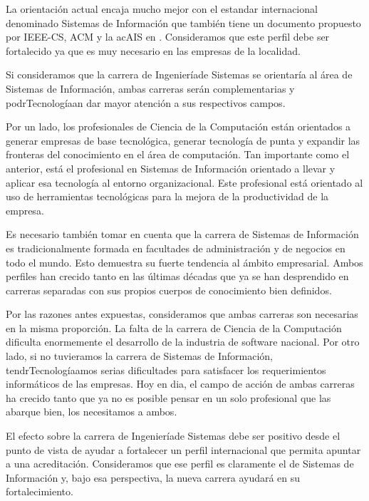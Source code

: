 La orientación actual encaja mucho mejor con el estandar
internacional denominado Sistemas de Información que también tiene
un documento propuesto por IEEE-CS, ACM y la ac{AIS} en
\cite{InformationSystems2002Journal}. Consideramos que este perfil debe ser
fortalecido ya que es muy necesario en las empresas de la localidad.

Si consideramos que la carrera de Ingenieríade Sistemas se
orientaría al área de Sistemas de Información, ambas carreras serán
complementarias y podrTecnologíaan dar mayor atención a sus respectivos
campos.

Por un lado, los profesionales de Ciencia de la Computación están orientados a generar empresas
de base tecnológica, generar tecnología de punta y expandir las
fronteras del conocimiento en el área de computación. Tan importante
como el anterior, está el profesional en Sistemas de Información
orientado a llevar y aplicar esa tecnología al entorno organizacional. Este profesional está orientado al uso de
herramientas tecnológicas para la mejora de la productividad de la empresa.

Es necesario también tomar en cuenta que la carrera de Sistemas de Información es tradicionalmente formada en facultades de administración y de negocios en todo el mundo. Esto demuestra su fuerte tendencia al ámbito empresarial. Ambos perfiles han crecido tanto en las últimas décadas que ya se han desprendido en carreras separadas con sus propios cuerpos de conocimiento bien definidos.

Por las razones antes expuestas, consideramos que ambas carreras son necesarias en la misma proporción. La falta de la carrera de Ciencia de la Computación dificulta enormemente el desarrollo de la industria de software nacional. Por otro lado, si no tuvieramos la carrera de Sistemas de Información, tendrTecnologíaamos serias dificultades para satisfacer los requerimientos informáticos de las empresas. Hoy en dia, el campo de acción de ambas carreras ha crecido tanto que ya no es posible pensar en un solo profesional que las abarque bien, los necesitamos a ambos.

El efecto sobre la carrera de Ingenieríade Sistemas debe ser positivo desde el punto de vista de ayudar a fortalecer un perfil internacional que permita apuntar a una acreditación. Consideramos que ese perfil es claramente el de Sistemas de Información y, bajo esa perspectiva, la nueva carrera ayudará en su fortalecimiento.